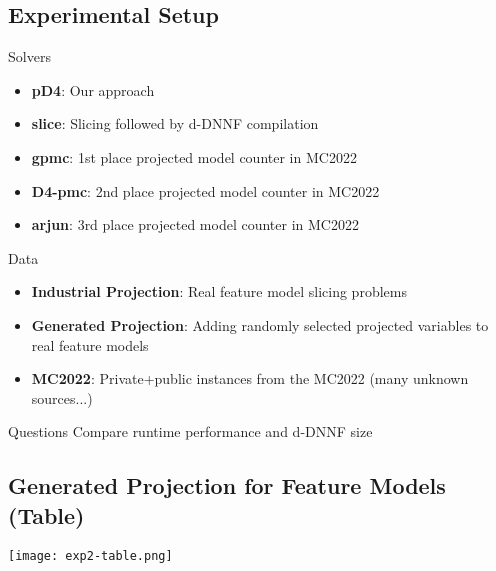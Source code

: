 \documentclass[
	aspectratio=169, %
	8pt, %
]{beamer}
\begin{document}
\subsection{Experimental Setup}
\begin{frame}{\insertsubsection}
\begin{block}{Solvers}
    \begin{itemize}
        \item {\bf pD4}: Our approach
        \item {\bf slice}: Slicing followed by d-DNNF compilation
        \item {\bf gpmc}: 1st place projected model counter in MC2022
        \item {\bf D4-pmc}: 2nd place projected model counter in MC2022
        \item {\bf arjun}: 3rd place projected model counter in MC2022
    \end{itemize}
\end{block}
\begin{block}{Data}
    \begin{itemize}
        \item {\bf Industrial Projection}: Real feature model slicing problems
        \item {\bf Generated Projection}: Adding randomly selected projected variables to real feature models
        \item {\bf MC2022}: Private+public instances from the MC2022 (many unknown sources...)
    \end{itemize}
\end{block}
\begin{block}{Questions}
    Compare runtime performance and d-DNNF size
\end{block}
\end{frame}

\subsection{Generated Projection for Feature Models (Table)}
\begin{frame}{\insertsubsection}
    \centering
    \texttt{[image: exp2-table.png]}
\end{frame}
\end{document}
